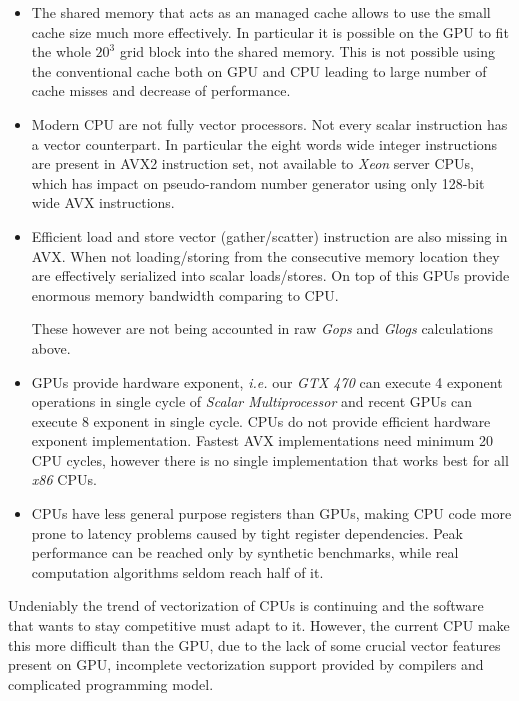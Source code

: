 \documentclass[a4paper]{llncs}
\begin{document}
\begin{itemize}

\item The shared memory that acts as an managed cache allows to use the small
cache size much more effectively. In particular it is possible on the GPU to
fit the whole $20^3$ grid block into the shared memory. This is not possible
using the conventional cache both on GPU and CPU leading to large number of
cache misses and decrease of performance.

\item Modern CPU are not fully vector processors. Not every scalar instruction
has a vector counterpart. In particular the eight words wide integer
instructions are present in AVX2 instruction set, not available to \emph{Xeon}
server CPUs, which has impact on pseudo-random number generator using only
128-bit wide AVX instructions.

\item Efficient load and store vector (gather/scatter) instruction are also
missing in AVX. When not loading/storing from the consecutive memory location
they are effectively serialized into scalar loads/stores. On top of this GPUs
provide enormous memory bandwidth comparing to CPU.

These however are not being accounted in raw \emph{Gops} and \emph{Glogs}
calculations above.

\item GPUs provide hardware exponent, \emph{i.e.} our \emph{GTX 470} can
execute 4 exponent operations in single cycle of \emph{Scalar Multiprocessor}
and recent GPUs can execute 8 exponent in single cycle. CPUs do not provide
efficient hardware exponent implementation. Fastest AVX
implementations\cite{svml} need minimum 20 CPU cycles, however there is no
single implementation that works best for all \emph{x86} CPUs\cite{nolib}.

\item CPUs have less general purpose registers than GPUs, making CPU code more
prone to latency problems caused by tight register dependencies. Peak
performance can be reached only by synthetic benchmarks, while real computation
algorithms seldom reach half of it.

\end{itemize}

Undeniably the trend of vectorization of CPUs is continuing and the software
that wants to stay competitive must adapt to it. However, the current CPU make
this more difficult than the GPU, due to the lack of some crucial vector
features present on GPU, incomplete vectorization support provided by compilers
and complicated programming model.
\end{document}
